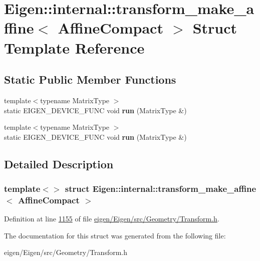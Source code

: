 \hypertarget{struct_eigen_1_1internal_1_1transform__make__affine_3_01_affine_compact_01_4}{}\section{Eigen\+:\+:internal\+:\+:transform\+\_\+make\+\_\+affine$<$ Affine\+Compact $>$ Struct Template Reference}
\label{struct_eigen_1_1internal_1_1transform__make__affine_3_01_affine_compact_01_4}
\subsection*{Static Public Member Functions}
\begin{DoxyCompactItemize}
\item 
\mbox{\label{struct_eigen_1_1internal_1_1transform__make__affine_3_01_affine_compact_01_4_a0c000f1bea35b59cf9ee9a2bd23d297d}} 
{\footnotesize template$<$typename Matrix\+Type $>$ }\\static E\+I\+G\+E\+N\+\_\+\+D\+E\+V\+I\+C\+E\+\_\+\+F\+U\+NC void {\bfseries run} (Matrix\+Type \&)
\item 
\mbox{\label{struct_eigen_1_1internal_1_1transform__make__affine_3_01_affine_compact_01_4_a0c000f1bea35b59cf9ee9a2bd23d297d}} 
{\footnotesize template$<$typename Matrix\+Type $>$ }\\static E\+I\+G\+E\+N\+\_\+\+D\+E\+V\+I\+C\+E\+\_\+\+F\+U\+NC void {\bfseries run} (Matrix\+Type \&)
\end{DoxyCompactItemize}


\subsection{Detailed Description}
\subsubsection*{template$<$$>$\newline
struct Eigen\+::internal\+::transform\+\_\+make\+\_\+affine$<$ Affine\+Compact $>$}



Definition at line \hyperlink{eigen_2_eigen_2src_2_geometry_2_transform_8h_source_l01155}{1155} of file \hyperlink{eigen_2_eigen_2src_2_geometry_2_transform_8h_source}{eigen/\+Eigen/src/\+Geometry/\+Transform.\+h}.



The documentation for this struct was generated from the following file\+:\begin{DoxyCompactItemize}
\item 
eigen/\+Eigen/src/\+Geometry/\+Transform.\+h\end{DoxyCompactItemize}
